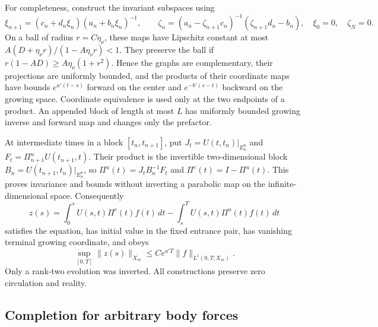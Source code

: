 For completeness, construct the invariant subspaces using
\begin{equation}
 \xi_{n+1}=(c_n+d_n\xi_n)(a_n+b_n\xi_n)^{-1},\qquad
 \zeta_n=(a_n-\zeta_{n+1}c_n)^{-1}(\zeta_{n+1}d_n-b_n),
 \quad \xi_0=0,\quad\zeta_N=0.
 \label{short-bg:graphs}
\end{equation}
On a ball of radius $r=C\eta_\nu$, these maps have Lipschitz constant
at most $A(D+\eta_\nu r)/(1-A\eta_\nu r)<1$. They preserve the ball
if $r(1-AD)\ge A\eta_\nu(1+r^2)$. Hence the graphs are complementary,
their projections are uniformly bounded, and the products of their
coordinate maps have bounds $e^{a'(t-s)}$ forward on the center and
$e^{-b'(s-t)}$ backward on the growing space. Coordinate equivalence
is used only at the two endpoints of a product. An appended block of
length at most $L$ has uniformly bounded growing inverse and forward
map and changes only the prefactor.

At intermediate times in a block $[t_n,t_{n+1}]$, put
$J_t=U(t,t_n)|_{E_n^u}$ and
$F_t=\Pi^u_{n+1}U(t_{n+1},t)$. Their product is the invertible
two-dimensional block $B_n=U(t_{n+1},t_n)|_{E_n^u}$, so
$\Pi^u(t)=J_tB_n^{-1}F_t$ and $\Pi^c(t)=I-\Pi^u(t)$.
This proves invariance and bounds without inverting a parabolic map
on the infinite-dimensional space. Consequently
\begin{equation}
 z(s)=\int_0^s U(s,t)\Pi^c(t)f(t)\,dt
       -\int_s^T U(s,t)\Pi^u(t)f(t)\,dt
 \label{short-bg:green}
\end{equation}
satisfies the equation, has initial value in the fixed entrance pair,
has vanishing terminal growing coordinate, and obeys
\begin{equation}
 \sup_{[0,T]}\|z(s)\|_{X_m}
       \le C e^{a'T}\|f\|_{L^1(0,T;X_m)}.
 \label{short-bg:green-bound}
\end{equation}
Only a rank-two evolution was inverted. All constructions preserve
zero circulation and reality.

\subsection{Completion for arbitrary body forces}

